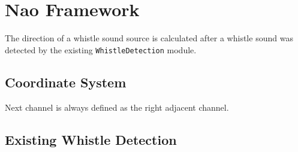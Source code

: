 \section{Nao Framework}
\label{sec:03_whistleLocalizationModule}

The direction of a whistle sound source is calculated after a whistle sound was detected
by the existing \lstinline!WhistleDetection! module.

\subsection{Coordinate System}
\label{subsec:03_coordinates}

Next channel is always defined as the right adjacent channel.

\subsection{Existing Whistle Detection}
\label{subsec:03_whistleDetection}

